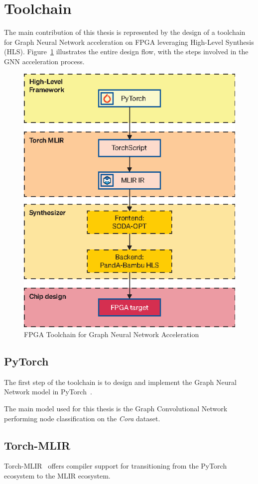 \documentclass[11pt,a4paper,twocolumn]{article}
\begin{document}

\section{Toolchain}
\label{sec:toolchain}%

The main contribution of this thesis is represented by the design of a toolchain for Graph Neural Network acceleration on FPGA leveraging High-Level Synthesis (HLS).
Figure~\ref{fig:toolchain} illustrates the entire design flow, with the steps involved in the GNN acceleration process.

\begin{figure}[t]
    \centering
    \includegraphics[height=0.36\textwidth]{Images/toolchain}
    \caption{FPGA Toolchain for Graph Neural Network Acceleration}
    \label{fig:toolchain}
\end{figure}

\subsection{PyTorch}
\label{subsec:pytorch-toolchain}%

The first step of the toolchain is to design and implement the Graph Neural Network model in PyTorch~\cite{DBLP:journals/corr/abs-1912-01703}.

The main model used for this thesis is the Graph Convolutional Network~\cite{DBLP:journals/corr/KipfW16} performing node classification on the \textit{Cora} dataset.

\subsection{Torch-MLIR}
\label{subsec:torch-mlir-toolchain}%

Torch-MLIR~\cite{torch_mlir} offers compiler support for transitioning from the PyTorch ecosystem to the MLIR ecosystem.
\end{document}
